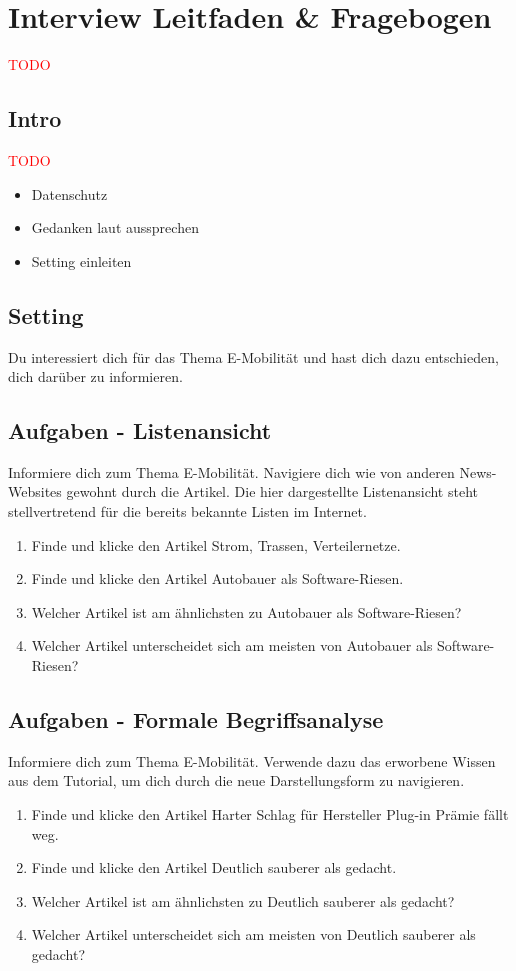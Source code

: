 \section{Interview Leitfaden \& Fragebogen}
\textcolor{red}{TODO}

\subsection{Intro}
\textcolor{red}{TODO}
\begin{itemize}
    \item Datenschutz
    \item Gedanken laut aussprechen
    \item Setting einleiten
\end{itemize}

\subsection{Setting}
Du interessiert dich für das Thema E-Mobilität und hast dich dazu entschieden, dich darüber zu informieren.

\subsection{Aufgaben - Listenansicht}
Informiere dich zum Thema E-Mobilität.
Navigiere dich wie von anderen News-Websites gewohnt durch die Artikel.
Die hier dargestellte Listenansicht steht stellvertretend für die bereits bekannte Listen im Internet.
\begin{enumerate}
    \item Finde und klicke den Artikel \glqq Strom, Trassen, Verteilernetze\grqq{}.
    \item Finde und klicke den Artikel \glqq Autobauer als Software-Riesen\grqq{}.
    \item Welcher Artikel ist am ähnlichsten zu \glqq Autobauer als Software-Riesen\grqq{}?
    \item Welcher Artikel unterscheidet sich am meisten von \glqq Autobauer als Software-Riesen\grqq{}?
\end{enumerate}

\subsection{Aufgaben - Formale Begriffsanalyse}
Informiere dich zum Thema E-Mobilität.
Verwende dazu das erworbene Wissen aus dem Tutorial, um dich durch die neue Darstellungsform zu navigieren.
\begin{enumerate}
    \item Finde und klicke den Artikel \glqq Harter Schlag für Hersteller Plug-in Prämie fällt weg\grqq{}.
    \item Finde und klicke den Artikel \glqq Deutlich sauberer als gedacht\grqq{}.
    \item Welcher Artikel ist am ähnlichsten zu \glqq Deutlich sauberer als gedacht\grqq{}?
    \item Welcher Artikel unterscheidet sich am meisten von \glqq Deutlich sauberer als gedacht\grqq{}?
\end{enumerate}

